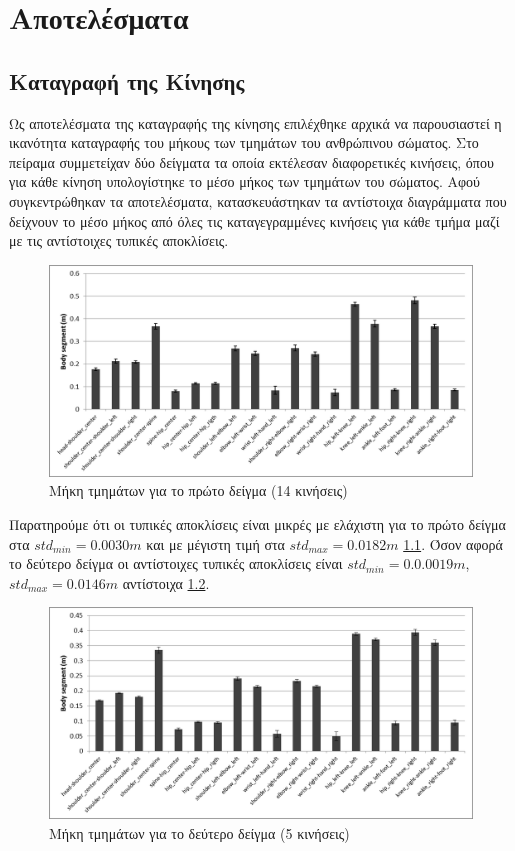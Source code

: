 \chapter{Αποτελέσματα}

\section{Καταγραφή της Κίνησης}

Ως αποτελέσματα της καταγραφής της κίνησης επιλέχθηκε αρχικά να παρουσιαστεί η ικανότητα καταγραφής του μήκους των τμημάτων του ανθρώπινου σώματος. Στο πείραμα συμμετείχαν δύο δείγματα τα οποία εκτέλεσαν διαφορετικές κινήσεις, όπου για κάθε κίνηση υπολογίστηκε το μέσο μήκος των τμημάτων του σώματος. Αφού συγκεντρώθηκαν τα αποτελέσματα, κατασκευάστηκαν τα αντίστοιχα διαγράμματα που δείχνουν το μέσο μήκος από όλες τις καταγεγραμμένες κινήσεις για κάθε τμήμα μαζί με τις αντίστοιχες τυπικές αποκλίσεις.

\begin{figure}[H]
    \centering
    \includegraphics[width=.9\textwidth]{fig/subject01-segments.png}
    \caption{Μήκη τμημάτων για το πρώτο δείγμα (14 κινήσεις)}
    \label{fig:subject01-segments}
\end{figure}

Παρατηρούμε ότι οι τυπικές αποκλίσεις είναι μικρές με ελάχιστη για το πρώτο δείγμα στα $std_{min} = 0.0030m$ και με μέγιστη τιμή στα $std_{max} = 0.0182m$ \ref{fig:subject01-segments}. Όσον αφορά το δεύτερο δείγμα οι αντίστοιχες τυπικές αποκλίσεις είναι $std_{min} = 0.0.0019m$, $std_{max} = 0.0146m$ αντίστοιχα \ref{fig:subject02-segments}.

\begin{figure}[H]
    \centering
    \includegraphics[width=.9\textwidth]{fig/subject02-segments.png}
    \caption{Μήκη τμημάτων για το δεύτερο δείγμα (5 κινήσεις)}
    \label{fig:subject02-segments}
\end{figure}

